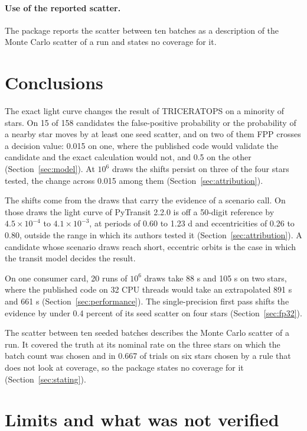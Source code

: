 \documentclass[11pt]{article}
\begin{document}
\paragraph{Use of the reported scatter.} The package reports the scatter between ten batches as a description of the Monte Carlo scatter of a run and states no coverage for it.

\section{Conclusions}

The exact light curve changes the result of TRICERATOPS on a minority of stars. On 15 of 158 candidates the false-positive probability or the probability of a nearby star moves by at least one seed scatter, and on two of them FPP crosses a decision value: 0.015 on one, where the published code would validate the candidate and the exact calculation would not, and 0.5 on the other (Section~\ref{sec:model}). At $10^{6}$ draws the shifts persist on three of the four stars tested, the change across 0.015 among them (Section~\ref{sec:attribution}).

The shifts come from the draws that carry the evidence of a scenario call. On those draws the light curve of PyTransit 2.2.0 is off a 50-digit reference by $4.5\times10^{-4}$ to $4.1\times10^{-3}$, at periods of 0.60 to 1.23 d and eccentricities of 0.26 to 0.80, outside the range in which its authors tested it (Section~\ref{sec:attribution}). A candidate whose scenario draws reach short, eccentric orbits is the case in which the transit model decides the result.

On one consumer card, 20 runs of $10^{6}$ draws take 88 s and 105 s on two stars, where the published code on 32 CPU threads would take an extrapolated 891 s and 661 s (Section~\ref{sec:performance}). The single-precision first pass shifts the evidence by under 0.4 percent of its seed scatter on four stars (Section~\ref{sec:fp32}).

The scatter between ten seeded batches describes the Monte Carlo scatter of a run. It covered the truth at its nominal rate on the three stars on which the batch count was chosen and in 0.667 of trials on six stars chosen by a rule that does not look at coverage, so the package states no coverage for it (Section~\ref{sec:stating}).

\section{Limits and what was not verified}\label{sec:limits}
\end{document}
